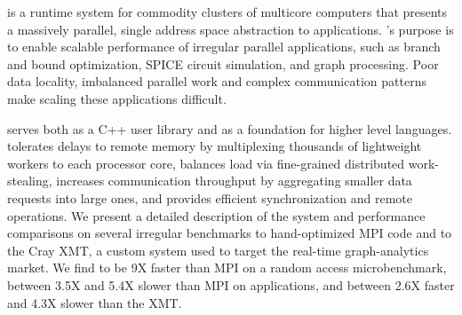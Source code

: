 \Grappa is a runtime system for commodity clusters of multicore computers that
presents a massively parallel, single address space abstraction to
applications. \Grappa's purpose is to enable scalable performance of irregular
parallel applications, such as  branch and bound optimization, SPICE circuit simulation, and graph processing. Poor data locality,
imbalanced parallel work and complex communication patterns make scaling these
applications difficult.

\Grappa serves both as a C++ user library and as a foundation for higher level
languages. \Grappa tolerates delays to remote memory by multiplexing thousands
of lightweight workers to each processor core, balances load via fine-grained
distributed work-stealing, increases communication throughput by aggregating
smaller data requests into large ones, and provides efficient synchronization
and remote operations. We present a detailed description of the \Grappa system
and performance comparisons on several irregular benchmarks to hand-optimized
MPI code and to the Cray XMT, a custom system used to target the real-time
graph-analytics market. We find \Grappa to be 9X faster than MPI on a random access microbenchmark, between 3.5X and 5.4X slower than MPI on applications, and between 2.6X faster
and 4.3X slower than the XMT.
